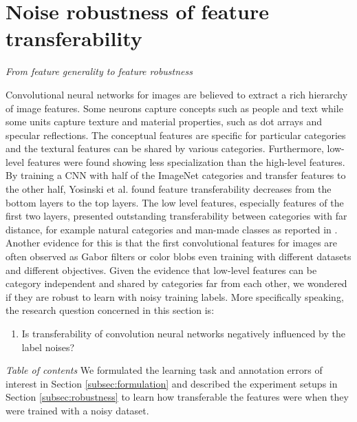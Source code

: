 \section{Noise robustness of feature transferability}
\label{sec:robustness}


\noindent \textit{From feature generality to feature robustness}

\noindent
Convolutional neural networks for images are believed to extract a rich hierarchy of image  features.
Some neurons capture concepts such as people and text while some units capture texture and material properties, such as dot arrays and specular reflections\cite{girshick2014rich}.
The conceptual features are specific for particular categories and the textural features can be shared by various categories.
Furthermore, low-level features were found showing less specialization than the high-level features.
By training a CNN with half of the ImageNet categories and transfer features to the other half, Yosinski et al.\cite{yosinski2014transferable} found feature transferability decreases from the bottom layers to the top layers.
The low level features, especially features of the first two layers, presented outstanding transferability between categories with far distance, for example natural categories and man-made classes as reported in \cite{yosinski2014transferable}.
Another evidence for this is that the first convolutional features for images are often observed as Gabor filters or color blobs even training with different datasets and different objectives\cite{zeiler2014visualizing,lee2009convolutional,krizhevsky2012imagenet,shin2016deep}.
Given the evidence that low-level features can be category independent and shared by categories far from each other, we wondered if they are robust to learn with noisy training labels.
More specifically speaking, the research question concerned in this section is:
\begin{enumerate}
  \item  Is transferability of convolution neural networks negatively influenced by the label noises?
\end{enumerate}

\noindent \textit{Table of contents}
\noindent
We formulated the learning task and annotation errors of interest in Section \ref{subsec:formulation} and described the experiment setups in Section \ref{subsec:robustness} to learn how transferable the features were when they were trained with a noisy dataset.


